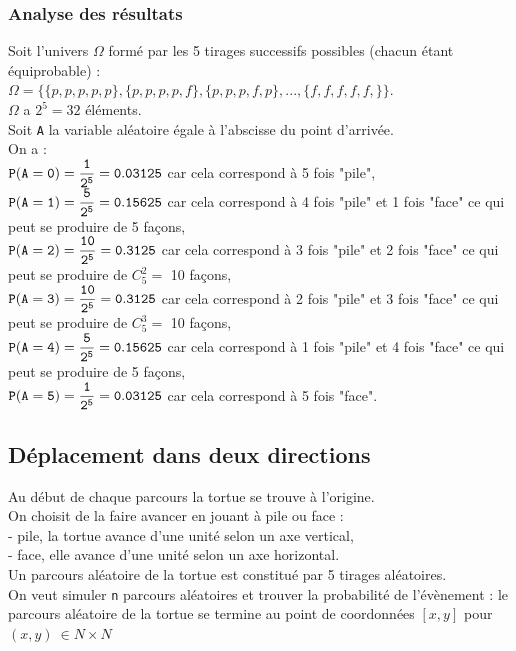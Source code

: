 \documentclass[a4paper,11pt]{book}
\begin{document}
\subsubsection{Analyse des r\'esultats}
Soit l'univers $\Omega$ form\'e par les 5 tirages successifs possibles (chacun 
\'etant \'equiprobable) :\\
$\Omega=\{\{p,p,p,p,p\},\{p,p,p,p,f\},\{p,p,p,f,p\},...,\{f,f,f,f,f,\}\}$.\\
$\Omega$ a $2^5=32$ \'el\'ements.\\
Soit {\tt A} la variable al\'eatoire \'egale \`a l'abscisse du point d'arriv\'ee.\\
On  a :\\
$\displaystyle {\tt P(A=0)=\frac{1}{2^5}=0.03125}$ car cela correspond \`a 5 fois "pile",\\
$\displaystyle {\tt P(A=1)=\frac{5}{2^5}=0.15625}$ car cela correspond \`a 4 fois "pile" et 1 
fois "face" ce qui peut se produire de 5 fa\c{c}ons, \\
$\displaystyle {\tt P(A=2)=\frac{10}{2^5}= 0.3125}$ car cela correspond \`a 3 fois "pile" et 2 
fois "face" ce qui peut se produire de $C_5^2=$ 10 fa\c{c}ons, \\
$\displaystyle {\tt P(A=3)=\frac{10}{2^5}= 0.3125}$ car cela correspond \`a 2 fois "pile" et 3 
fois "face" ce qui peut se produire de $C_5^3=$ 10 fa\c{c}ons, \\
$\displaystyle {\tt P(A=4)=\frac{5}{2^5}=0.15625}$ car cela correspond \`a 1 fois "pile" et 4
fois "face" ce qui peut se produire de 5 fa\c{c}ons, \\
$\displaystyle {\tt P(A=5)=\frac{1}{2^5}=0.03125}$ car cela correspond \`a 5 fois "face".
\subsection{D\'eplacement dans deux directions}
Au d\'ebut de chaque parcours la tortue se trouve \`a l'origine.\\
On choisit de la faire avancer en jouant \`a pile ou face :\\
- pile, la tortue avance d'une unit\'e selon un axe vertical,\\
- face, elle avance d'une unit\'e selon un axe horizontal.\\ 
Un parcours al\'eatoire de la tortue est constitu\'e par 5 tirages al\'eatoires.\\
On veut simuler {\tt n} parcours al\'eatoires et trouver la 
probabilit\'e de l'\'ev\`enement : le parcours al\'eatoire de la tortue se termine au point de coordonn\'ees $[x,y]$ pour $(x,y) \ \in N \times N$
\end{document}
